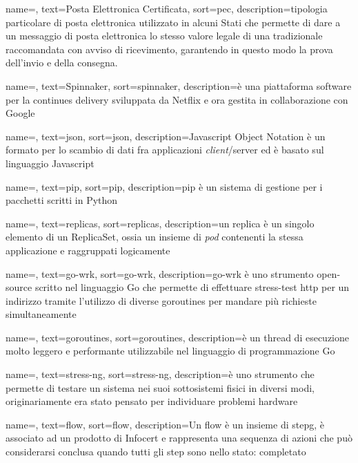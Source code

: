 {
    name=,
    text=Posta Elettronica Certificata,
    sort=pec,
    description={tipologia particolare di posta elettronica utilizzato in alcuni Stati che permette di dare a un messaggio di posta elettronica lo stesso valore legale di una tradizionale raccomandata con avviso di ricevimento, garantendo in questo modo la prova dell’invio e della consegna.}
}

{
    name=,
    text=Spinnaker,
    sort=spinnaker,
    description={è una piattaforma software per la continues delivery sviluppata da Netflix e ora gestita in collaborazione con Google}
}

{
    name=,
    text=json,
    sort=json,
    description={Javascript Object Notation è un formato per lo scambio di dati fra applicazioni \textit{client}/server ed è basato sul linguaggio Javascript}
}

{
    name=,
    text=pip,
    sort=pip,
    description={pip è un sistema di gestione per i pacchetti scritti in Python}
}

{
    name=,
    text=replicas,
    sort=replicas,
    description={un replica è un singolo elemento di un ReplicaSet, ossia un insieme di \textit{pod} contenenti la stessa applicazione e raggruppati logicamente}
}

{
    name=,
    text=go-wrk,
    sort=go-wrk,
    description={go-wrk è uno strumento open-source scritto nel linguaggio Go che permette di effettuare stress-test http per un indirizzo tramite l'utilizzo di diverse goroutines per mandare più richieste simultaneamente}
}

{
    name=,
    text=goroutines,
    sort=goroutines,
    description={è un thread di esecuzione molto leggero e performante utilizzabile nel linguaggio di programmazione Go}
}

{
    name=,
    text=stress-ng,
    sort=stress-ng,
    description={è uno strumento che permette di testare un sistema nei suoi sottosistemi fisici in diversi modi, originariamente era stato pensato per individuare problemi hardware}
}

{
    name=,
    text=flow,
    sort=flow,
    description={Un flow è un insieme di \gls{stepg}, è associato ad un prodotto di Infocert e rappresenta una sequenza di azioni che può considerarsi conclusa quando tutti gli step sono nello stato: completato}
}

